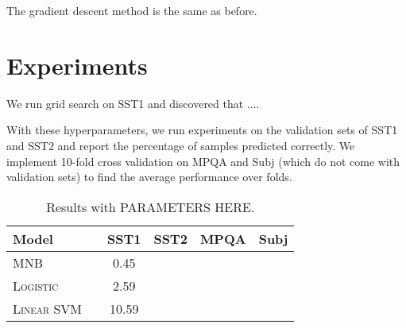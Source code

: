 \documentclass[11pt]{article}
\begin{document}
The gradient descent method is the same as before.


\begin{figure}

  \begin{algorithmic}[1]

    \EndWhile{}
    \EndProcedure{}
  \end{algorithmic}

\end{figure}


\section{Experiments}

We run grid search on SST1 and discovered that ....

With these hyperparameters, we run experiments on the validation sets of SST1 and SST2 and report the percentage of samples predicted correctly. We implement 10-fold cross validation on MPQA and Subj (which do not come with validation sets) to find the average performance over folds.

\begin{table}[h]
\centering
\begin{tabular}{llcccc}
 \toprule
 Model &  & SST1 & SST2 & MPQA & Subj \\
 \midrule
 \textsc{MNB} & & 0.45\\
 \textsc{Logistic} & & 2.59 \\
 \textsc{Linear SVM} & & 10.59  \\
 \bottomrule
\end{tabular}
\caption{\label{tab:results} Results with PARAMETERS HERE.}
\end{table}



\end{document}

